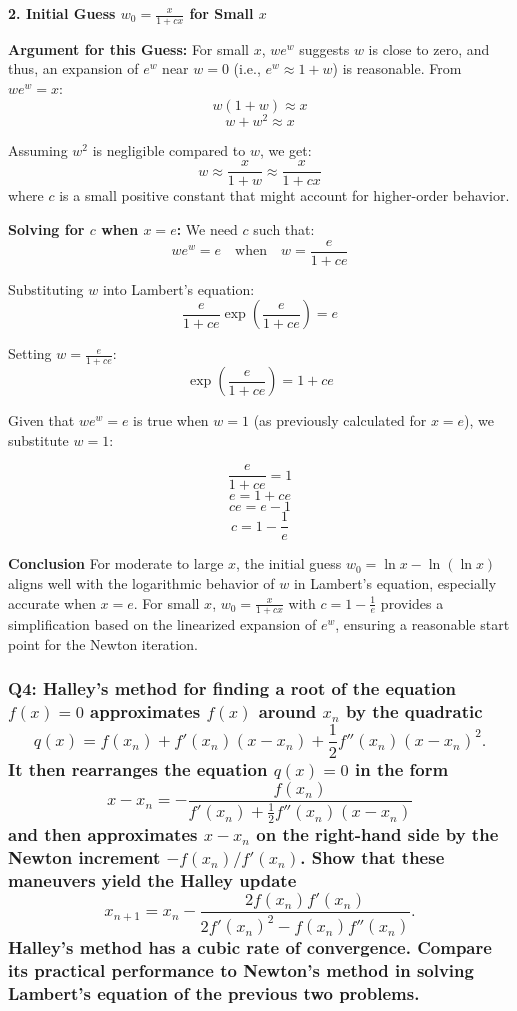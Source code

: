 \documentclass[8pt]{article}
\begin{document}
\textbf{2. Initial Guess \(w_0 = \frac{x}{1 + cx}\) for Small \(x\)}

\textbf{Argument for this Guess:}
For small \(x\), \(we^w\) suggests \(w\) is close to zero, and thus, an expansion of \(e^w\) near \(w = 0\) (i.e., \(e^w \approx 1 + w\)) is reasonable. From \(we^w = x\):
\[ w(1 + w) \approx x \]
\[ w + w^2 \approx x \]

Assuming \(w^2\) is negligible compared to \(w\), we get:
\[ w \approx \frac{x}{1 + w} \approx \frac{x}{1 + cx} \]
where \(c\) is a small positive constant that might account for higher-order behavior.

\textbf{Solving for \(c\) when \(x = e\):}
We need \(c\) such that:
\[ we^w = e \quad \text{when} \quad w = \frac{e}{1 + ce} \]

Substituting \(w\) into Lambert's equation:
\[ \frac{e}{1 + ce} \exp\left(\frac{e}{1 + ce}\right) = e \]

Setting \(w = \frac{e}{1 + ce}\):
\[ \exp\left(\frac{e}{1 + ce}\right) = 1 + ce \]

Given that \(we^w = e\) is true when \(w = 1\) (as previously calculated for \(x = e\)), we substitute \(w = 1\):

\[ \frac{e}{1 + ce} = 1 \]
\[ e = 1 + ce \]
\[ ce = e - 1 \]
\[ c = 1 - \frac{1}{e} \]

\textbf{Conclusion}
For moderate to large \(x\), the initial guess \(w_0 = \ln x - \ln(\ln x)\) aligns well with the logarithmic behavior of \(w\) in Lambert's equation, especially accurate when \(x = e\). For small \(x\), \(w_0 = \frac{x}{1 + cx}\) with \(c = 1 - \frac{1}{e}\) provides a simplification based on the linearized expansion of \(e^w\), ensuring a reasonable start point for the Newton iteration.

\subsubsection*{Q4: Halley’s method for finding a root of the equation \(f(x) = 0\) approximates \(f(x)\) around \(x_n\) by the quadratic
\[ q(x) = f(x_n) + f'(x_n)(x - x_n) + \frac{1}{2} f''(x_n)(x - x_n)^2. \]
It then rearranges the equation \(q(x) = 0\) in the form
\[ x - x_n = -\frac{f(x_n)}{f'(x_n) + \frac{1}{2} f''(x_n)(x - x_n)} \]
and then approximates \(x - x_n\) on the right-hand side by the Newton increment \(-f(x_n)/f'(x_n)\). Show that these maneuvers yield the Halley update
\[ x_{n+1} = x_n - \frac{2f(x_n)f'(x_n)}{2f'(x_n)^2 - f(x_n)f''(x_n)}. \]
Halley’s method has a cubic rate of convergence. Compare its practical performance to Newton’s method in solving Lambert’s equation of the previous two problems.}
\end{document}
